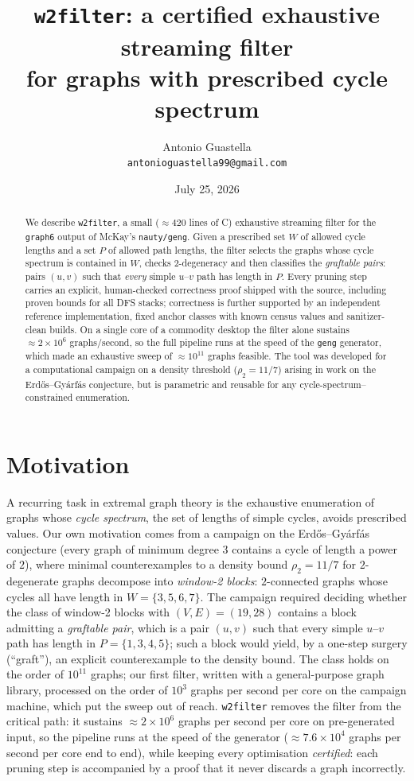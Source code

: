 \documentclass[11pt]{article}
\title{\texttt{w2filter}: a certified exhaustive streaming filter\\
for graphs with prescribed cycle spectrum}
\author{Antonio Guastella\\[2pt]
{\small\texttt{antonioguastella99@gmail.com}}}
\date{July 25, 2026}
\begin{document}
\maketitle

\begin{abstract}
We describe \texttt{w2filter}, a small ($\approx 420$ lines of C)
exhaustive streaming filter for the \texttt{graph6} output of
McKay's \texttt{nauty/geng}. Given a prescribed set $W$ of allowed
cycle lengths and a set $P$ of allowed path lengths, the filter
selects the graphs whose cycle spectrum is contained in $W$, checks
$2$-degeneracy and then classifies the \emph{graftable pairs}: pairs
$(u,v)$ such that \emph{every} simple $u$--$v$ path has length in
$P$. Every pruning step carries an explicit, human-checked
correctness proof shipped with the source, including proven bounds
for all DFS stacks; correctness is further
supported by an independent reference implementation, fixed anchor
classes with known census values and sanitizer-clean builds. On a
single core of a commodity desktop the filter alone sustains
$\approx 2\times 10^6$ graphs/second, so the full pipeline runs at
the speed of the \texttt{geng} generator, which made an exhaustive
sweep of $\approx 10^{11}$ graphs feasible. The
tool was developed for a
computational campaign on a density threshold ($\rho_2 = 11/7$)
arising in work on the Erd\H{o}s--Gy\'arf\'as conjecture, but is
parametric and reusable for any cycle-spectrum--constrained
enumeration.
\end{abstract}

\section{Motivation}

A recurring task in extremal graph theory is the exhaustive
enumeration of graphs whose \emph{cycle spectrum}, the set of
lengths of simple cycles, avoids prescribed values. Our own
motivation comes from a campaign on the Erd\H{o}s--Gy\'arf\'as
conjecture (every graph of minimum degree $3$ contains a cycle of
length a power of $2$), where minimal counterexamples to a density
bound $\rho_2 = 11/7$ for $2$-degenerate graphs decompose into
\emph{window-2 blocks}: $2$-connected graphs whose cycles all have
length in $W = \{3,5,6,7\}$. The campaign required deciding whether
the class of window-2 blocks with $(V,E) = (19,28)$ contains a block
admitting a \emph{graftable pair}, which is a pair $(u,v)$ such that every simple $u$--$v$ path has length in $P = \{1,3,4,5\}$; such a block
would yield, by a one-step surgery (``graft''), an explicit
counterexample to the density bound. The class holds on the order of
$10^{11}$ graphs; our first filter, written with a general-purpose
graph library, processed on the order of $10^3$ graphs per second
per core on the campaign machine, which put the sweep out of reach.
\texttt{w2filter}
removes the filter from the critical path: it sustains
$\approx 2\times 10^6$ graphs per second per core on pre-generated
input, so the pipeline runs at the speed of the generator
($\approx 7.6\times 10^4$ graphs per second per core end to end),
while keeping every optimisation \emph{certified}: each pruning
step is accompanied by a proof that it never discards a graph
incorrectly.
\end{document}
